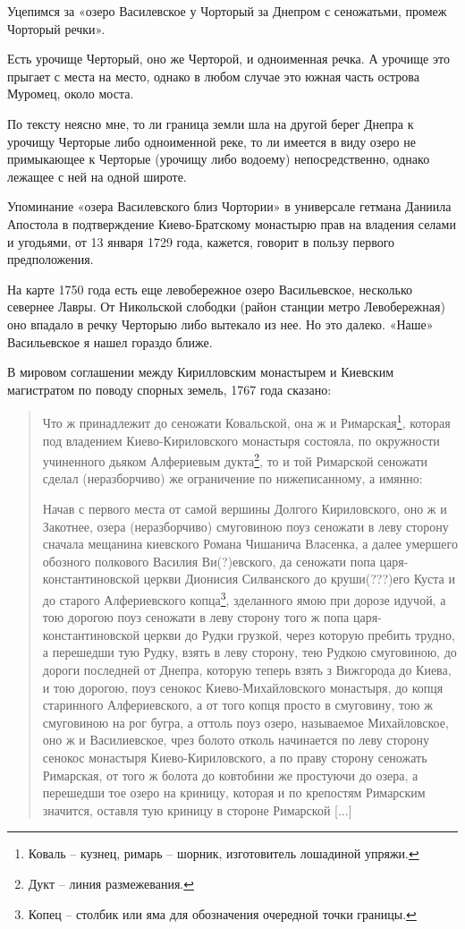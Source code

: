 Уцепимся за «озеро Василевское у Чорторый за Днепром с сеножатьми, промеж Чорторый речки». 

Есть урочище Черторый, оно же Черторой, и одноименная речка. А урочище это прыгает с места на место, однако в любом случае это южная часть острова Муромец, около моста.
 

По тексту неясно мне, то ли граница земли шла на другой берег Днепра к урочищу Черторые либо одноименной реке, то ли имеется в виду озеро не примыкающее к Черторые (урочищу либо водоему) непосредственно, однако лежащее с ней на одной широте.

Упоминание «озера Василевского близ Чортории» в универсале гетмана Даниила Апостола в подтверждение Киево-Братскому монастырю прав на владения селами и угодьями, от 13 января 1729 года, кажется, говорит в пользу первого предположения.

На карте 1750 года есть еще левобережное озеро Васильевское, несколько севернее Лавры. От Никольской слободки (район станции метро Левобережная) оно впадало в речку Черторыю либо вытекало из нее. Но это далеко. «Наше» Васильевское я нашел гораздо ближе.

В мировом соглашении между Кирилловским монастырем и Киевским магистратом по поводу спорных земель, 1767 года сказано:

\begin{quotation}
Что ж принадлежит до сеножати Ковальской, она ж и Римарская\footnote{Коваль – кузнец, римарь – шорник, изготовитель лошадиной упряжи.}, которая под владением Киево-Кириловского монастыря состояла, по окружности учиненного дьяком Алфериевым дукта\footnote{Дукт – линия размежевания.}, то и той Римарской сеножати сделал (неразборчиво) же ограничение по нижеписанному, а имянно:

Начав с первого места от самой вершины Долгого Кириловского, оно ж и Закотнее, озера (неразборчиво) смуговиною поуз сеножати в леву сторону сначала мещанина киевского Романа Чишанича Власенка, а далее умершего обозного полкового Василия Ви(?)евского, да сеножати попа царя-константиновской церкви Дионисия Силванского до круши(???)его Куста и до старого Алфериевского копца\footnote{Копец – столбик или яма для обозначения очередной точки границы.}, зделанного ямою при дорозе идучой, а тою дорогою поуз сеножати в леву сторону того ж попа царя-константиновской церкви до Рудки грузкой, через которую пребить трудно, а перешедши тую Рудку, взять в леву сторону, тею Рудкою смуговиною, до дороги последней от Днепра, которую теперь взять з Вижгорода до Киева, и тою дорогою, поуз сенокос Киево-Михайловского монастыря, до копця старинного Алфериевского, а от того копця просто в смуговину, тою ж смуговиною на рог бугра, а оттоль поуз озеро, называемое Михайловское, оно ж и Василиевское, чрез болото отколь начинается по леву сторону сенокос монастыря Киево-Кириловского, а по праву сторону сеножать Римарская, от того ж болота до ковтобини же простуючи до озера, а перешедши тое озеро на криницу, которая и по крепостям Римарским значится, оставля тую криницу в стороне Римарской [...]
\end{quotation}

